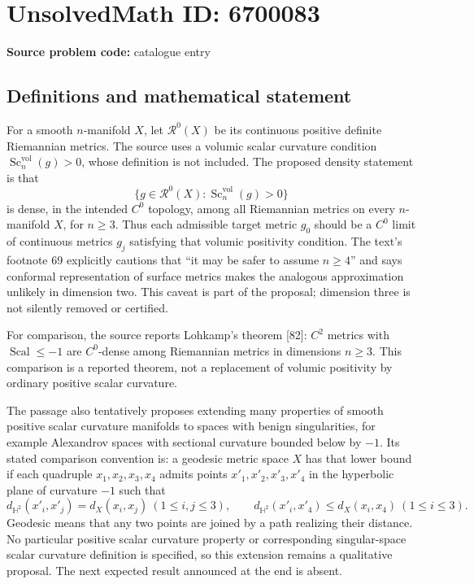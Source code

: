 \documentclass[11pt]{article}
\begin{document}
\section*{UnsolvedMath ID: 6700083}
\textbf{Source problem code:} catalogue entry
\subsection{Definitions and mathematical statement}
For a smooth \(n\)-manifold \(X\), let \(\mathcal R^0(X)\) be its continuous positive definite Riemannian metrics. The source uses a volumic scalar curvature condition \(\operatorname{Sc}^{\mathrm{vol}}_n(g)>0\), whose definition is not included. The proposed density statement is that
\[
 \{g\in\mathcal R^0(X):\operatorname{Sc}^{\mathrm{vol}}_n(g)>0\}
\]
is dense, in the intended \(C^0\) topology, among all Riemannian metrics on every \(n\)-manifold \(X\), for \(n\geq3\). Thus each admissible target metric \(g_0\) should be a \(C^0\) limit of continuous metrics \(g_j\) satisfying that volumic positivity condition. The text's footnote 69 explicitly cautions that ``it may be safer to assume \(n\geq4\)'' and says conformal representation of surface metrics makes the analogous approximation unlikely in dimension two. This caveat is part of the proposal; dimension three is not silently removed or certified.

For comparison, the source reports Lohkamp's theorem [82]: \(C^2\) metrics with \(\operatorname{Scal}\leq-1\) are \(C^0\)-dense among Riemannian metrics in dimensions \(n\geq3\). This comparison is a reported theorem, not a replacement of volumic positivity by ordinary positive scalar curvature.

The passage also tentatively proposes extending many properties of smooth positive scalar curvature manifolds to spaces with benign singularities, for example Alexandrov spaces with sectional curvature bounded below by \(-1\). Its stated comparison convention is: a geodesic metric space \(X\) has that lower bound if each quadruple \(x_1,x_2,x_3,x_4\) admits points \(x'_1,x'_2,x'_3,x'_4\) in the hyperbolic plane of curvature \(-1\) such that
\[
 d_{\mathbb H^2}(x'_i,x'_j)=d_X(x_i,x_j)\ (1\leq i,j\leq3),\qquad
 d_{\mathbb H^2}(x'_i,x'_4)\leq d_X(x_i,x_4)\ (1\leq i\leq3).
\]
Geodesic means that any two points are joined by a path realizing their distance. No particular positive scalar curvature property or corresponding singular-space scalar curvature definition is specified, so this extension remains a qualitative proposal. The next expected result announced at the end is absent.
\end{document}
